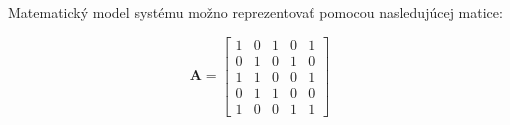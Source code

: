 \documentclass[10pt]{article}
\begin{document}
Matematický model systému možno reprezentovať
pomocou nasledujúcej matice:

\begin{equation}
    \mathbf{A} =
    \begin{bmatrix}
        1 & 0 & 1 & 0 & 1 \\
        0 & 1 & 0 & 1 & 0 \\
        1 & 1 & 0 & 0 & 1 \\
        0 & 1 & 1 & 0 & 0 \\
        1 & 0 & 0 & 1 & 1
    \end{bmatrix}
\end{equation}
\end{document}

